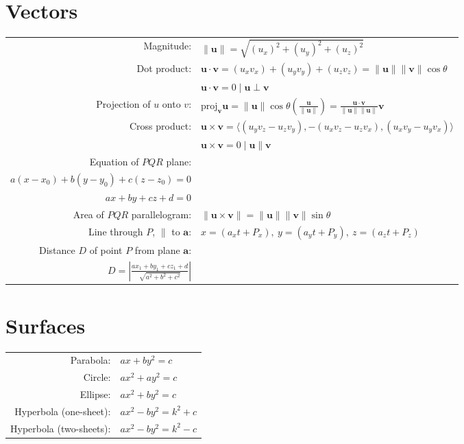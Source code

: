 \documentclass[fleqn]{article}
\renewcommand{\vec}[1]{\mathbf{#1}}
\begin{document}
\section*{Vectors}
\begin{tabularx}{\linewidth}{r l}
  Magnitude: &
    \( \|\vec u\|=\sqrt{{(u_{x})}^2+{(u_{y})}^2+{(u_{z})}^2} \) \\
  Dot product: &
    \( \vec u\cdot\vec v=
      (u_{x}v_x)+(u_{y}v_{y})+(u_{z}v_{z})=
      \|\vec u\|\|\vec v\|\cos\theta \) \\
  & \( \vec u\cdot\vec v=0\mid\vec u\perp\vec v \) \\
  Projection of \(u\) onto \(v\): &
    \( \text{proj}_{\vec v}\vec u =
      \|\vec u\|\cos\theta\left(\frac{\vec u}{\|\vec u\|}\right)=
      \frac{\vec u\cdot\vec v}{\|\vec u\|\|\vec u\|}\vec v \) \\
  Cross product: &
    \( \vec u\times\vec v=
      \langle (u_{y}v_{z}-u_{z}v_{y}),-(u_{x}v_{z}-u_{z}v_{x}),(u_{x}v_{y}-u_{y}v_{x})\rangle \) \\
  & \( \vec u\times\vec v=0\mid\vec u\parallel\vec v \) \\
  Equation of \(PQR\) plane: &
    \begin{tabular}[t]{@{}l}
      \( \vec n=\vec u\times\vec v=\langle a,b,c\rangle \) \\
      \( a(x-x_0)+b(y-y_0)+c(z-z_0)=0 \) \\
      \( ax+by+cz+d=0 \)
    \end{tabular} \\
  Area of \(PQR\) parallelogram: & \( \|\vec u\times\vec v\|=\|\vec u\|\|\vec v\|\sin\theta \) \\
  Line through \(P\), \(\parallel\) to \(\vec a\): &
    \( x=(a_x t+P_x),\ y=(a_y t+P_y),\ z=(a_z t+P_z) \) \\
  Distance \(D\) of point \(P\) from plane \(\vec a\): &
    \begin{tabular}[t]{@{}l}
      \( \vec a=ax+by+cz+d=0,\ P=\langle x_1,y_1,z_1\rangle \) \\
      \( D=\left|\frac{ax_1+by_1+cz_1+d}{\sqrt{a^2+b^2+c^2}}\right| \)
    \end{tabular} \\
\end{tabularx}

\section*{Surfaces}
\begin{tabularx}{\linewidth}{r l}
  Parabola: & \( ax+by^2=c \) \\
  Circle: & \( ax^2+ay^2=c \) \\
  Ellipse: & \( ax^2+by^2=c \) \\
  Hyperbola (one-sheet): & \( ax^2-by^2=k^2+c \) \\
  Hyperbola (two-sheets): & \( ax^2-by^2=k^2-c \) \\
\end{tabularx}
\end{document}
